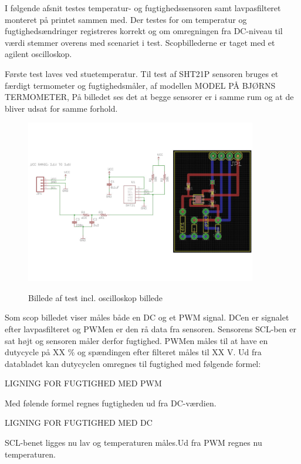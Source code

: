 

I følgende afsnit testes temperatur- og fugtighedssensoren samt lavpasfilteret monteret på printet sammen med. Der testes for om temperatur og fugtighedsændringer registreres korrekt og om omregningen fra DC-niveau til værdi stemmer overens med scenariet i test. Scopbillederne er taget med et agilent oscilloskop.

Første test laves ved stuetemperatur. Til test af SHT21P sensoren bruges et færdigt termometer og fugtighedsmåler, af modellen MODEL PÅ BJØRNS TERMOMETER, På billedet ses det at begge sensorer er i samme rum og at de bliver udsat for samme forhold. 

\begin{figure}[h]
\centering
{\includegraphics[width=0.90\textwidth]{filer/modultest/Billeder/test_stue}}
\caption{Billede af test incl. oscilloskop billede}
\label{lab:test_stue}
\end{figure}

Som scop billedet viser måles både en DC og et PWM signal. DCen er signalet efter lavpasfilteret og PWMen er den rå data fra sensoren. 
Sensorens SCL-ben er sat højt og sensoren måler derfor fugtighed. PWMen måles til at have en dutycycle på XX \% og spændingen efter filteret måles til XX V. Ud fra databladet kan dutycyclen omregnes til fugtighed med følgende formel:

LIGNING FOR FUGTIGHED MED PWM

Med følende formel regnes fugtigheden ud fra DC-værdien.

LIGNING FOR FUGTIGHED MED DC

SCL-benet ligges nu lav og temperaturen måles.Ud fra PWM regnes nu temperaturen.

